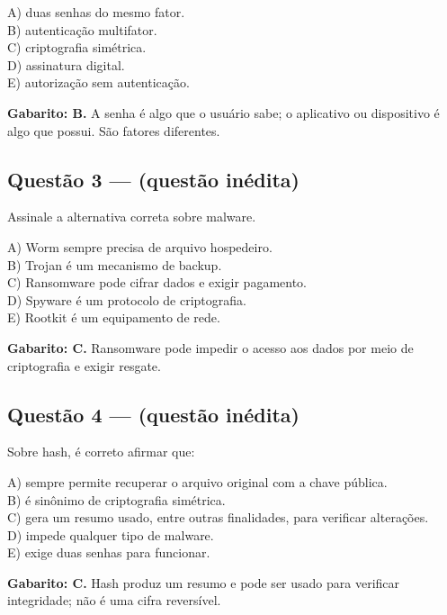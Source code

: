 \documentclass[11pt,a4paper]{article}
\begin{document}
A) duas senhas do mesmo fator. \\ B) autenticação multifator. \\ C) criptografia simétrica. \\ D) assinatura digital. \\ E) autorização sem autenticação.

\begin{alerta}
\textbf{Gabarito: B.} A senha é algo que o usuário sabe; o aplicativo ou dispositivo é algo que possui. São fatores diferentes.
\end{alerta}

\subsection*{Questão 3 — (questão inédita)}

Assinale a alternativa correta sobre malware.

A) Worm sempre precisa de arquivo hospedeiro. \\ B) Trojan é um mecanismo de backup. \\ C) Ransomware pode cifrar dados e exigir pagamento. \\ D) Spyware é um protocolo de criptografia. \\ E) Rootkit é um equipamento de rede.

\begin{alerta}
\textbf{Gabarito: C.} Ransomware pode impedir o acesso aos dados por meio de criptografia e exigir resgate.
\end{alerta}

\subsection*{Questão 4 — (questão inédita)}

Sobre hash, é correto afirmar que:

A) sempre permite recuperar o arquivo original com a chave pública. \\ B) é sinônimo de criptografia simétrica. \\ C) gera um resumo usado, entre outras finalidades, para verificar alterações. \\ D) impede qualquer tipo de malware. \\ E) exige duas senhas para funcionar.

\begin{alerta}
\textbf{Gabarito: C.} Hash produz um resumo e pode ser usado para verificar integridade; não é uma cifra reversível.
\end{alerta}
\end{document}
